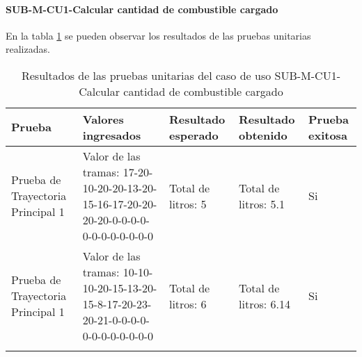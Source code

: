 \paragraph{SUB-M-CU1-Calcular cantidad de combustible cargado}\label{SUB-M-CU1:Pruebas}
En la tabla \ref{pruebas_unitarias_sub-m-cu1} se pueden observar los resultados de las pruebas unitarias realizadas.
\begin{longtable}{|M{2cm}| M{4.5cm}|M{3cm}|M{3cm}|M{1.5cm}|}
	\hline
	\textbf{Prueba} & \textbf{Valores ingresados} & \textbf{Resultado esperado} & \textbf{Resultado obtenido} & \textbf{Prueba exitosa} \\ \hline
	Prueba de Trayectoria Principal 1& Valor de las tramas: 17-20-10-20-20-13-20-15-16-17-20-20-20-20-0-0-0-0-0-0-0-0-0-0-0-0
	& Total de litros: 5 & Total de litros: 5.1 & Si \\ \hline
	Prueba de Trayectoria Principal 1& Valor de las tramas: 10-10-10-20-15-13-20-15-8-17-20-23-20-21-0-0-0-0-0-0-0-0-0-0-0-0
	& Total de litros: 6 & Total de litros: 6.14 & Si \\ \hline
	\caption{Resultados de las pruebas unitarias del caso de uso SUB-M-CU1-Calcular cantidad de combustible cargado}
	\label{pruebas_unitarias_sub-m-cu1}
\end{longtable}

